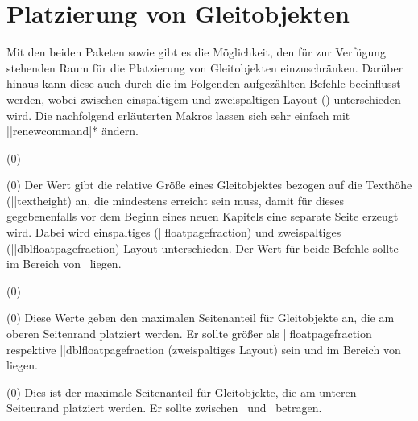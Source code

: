 \section{%
  Platzierung von Gleitobjekten%
  \label{sec:tips:floats}%
}
%
\begin{Entity}{}
Mit den beiden Paketen  sowie  gibt es die 
Möglichkeit, den für  zur Verfügung stehenden Raum für die 
Platzierung von Gleitobjekten einzuschränken. Darüber hinaus kann diese auch 
durch die im Folgenden aufgezählten Befehle beeinflusst werden, wobei zwischen 
einspaltigem und zweispaltigen Layout () unterschieden wird. 
Die nachfolgend erläuterten Makros lassen sich sehr einfach mit 
\Macro||{renewcommand|*} ändern. 

\begin{Declaration}
  {}
  (0\floatpagefraction)
\begin{Declaration}
  {}
  (0\dblfloatpagefraction)
\printdeclarationlist
%
Der Wert gibt die relative Größe eines Gleitobjektes bezogen auf die Texthöhe 
(\Length||{textheight}) an, die mindestens erreicht sein muss, damit für dieses 
gegebenenfalls vor dem Beginn eines neuen Kapitels eine separate Seite erzeugt 
wird. Dabei wird einspaltiges (\Macro||{floatpagefraction}) und zweispaltiges 
(\Macro||{dblfloatpagefraction}) Layout unterschieden. Der Wert für beide 
Befehle sollte im Bereich von~ liegen.
\end{Declaration}
\end{Declaration}

\begin{Declaration}
  {}
  (0\topfraction)
\begin{Declaration}
  {}
  (0\dbltopfraction)
\printdeclarationlist
%
Diese Werte geben den maximalen Seitenanteil für Gleitobjekte an, die am oberen 
Seitenrand platziert werden. Er sollte größer als \Macro||{floatpagefraction} 
respektive \Macro||{dblfloatpagefraction} (zweispaltiges Layout) sein und im 
Bereich von  liegen. 
\end{Declaration}
\end{Declaration}

\begin{Declaration}
  {}
  (0\bottomfraction)
\printdeclarationlist
%
Dies ist der maximale Seitenanteil für Gleitobjekte, die am unteren Seitenrand 
platziert werden. Er sollte zwischen~ und~ betragen.
\end{Declaration}


\end{Entity}
